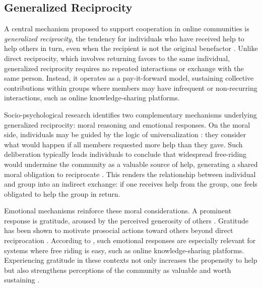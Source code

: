 \subsection{Generalized Reciprocity}

A central mechanism proposed to support cooperation in online communities is \textit{generalized reciprocity}, the tendency for individuals who have received help to help others in turn, even when the recipient is not the original benefactor \citep{nowak_upstream_2007, fowler_cooperative_2010}. Unlike direct reciprocity, which involves returning favors to the same individual, generalized reciprocity requires no repeated interactions or exchange with the same person. Instead, it operates as a pay-it-forward model, sustaining collective contributions within groups where members may have infrequent or non-recurring interactions, such as online knowledge-sharing platforms.

Socio-psychological research identifies two complementary mechanisms underlying generalized reciprocity: moral reasoning and emotional responses. On the moral side, individuals may be guided by the logic of universalization \citep{levine_logic_2020}: they consider what would happen if all members requested more help than they gave. Such deliberation typically leads individuals to conclude that widespread free-riding would undermine the community as a valuable source of help, generating a shared moral obligation to reciprocate \citep{curry_is_2019}. This renders the relationship between individual and group into an indirect exchange: if one receives help from the group, one feels obligated to help the group in return.

Emotional mechanisms reinforce these moral considerations. A prominent response is gratitude, aroused by the perceived generosity of others \citep{mccullough_is_2001, mccullough_adaptation_2008}. Gratitude has been shown to motivate prosocial actions toward others beyond direct reciprocation \citep{tsang_gratitude_2006, bartlett_gratitude_2006}. According to \citet{molm_building_2007}, such emotional responses are especially relevant for systems where free riding is easy, such as online knowledge-sharing platforms. Experiencing gratitude in these contexts not only increases the propensity to help but also strengthens perceptions of the community as valuable and worth sustaining \citep{elster_norms_2009}.

